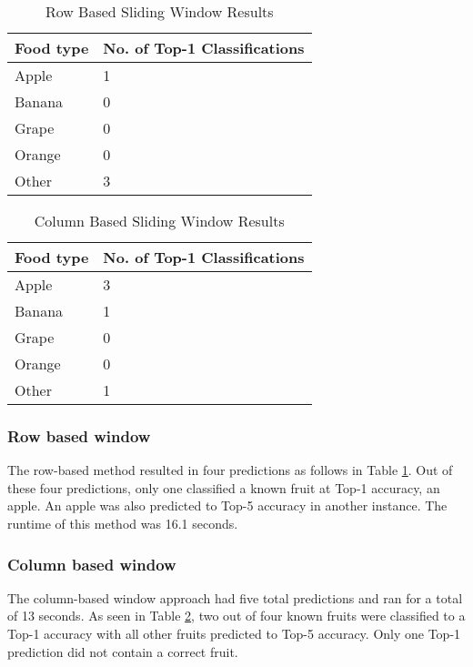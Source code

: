 \begin{table}[]
	\centering
	\caption{Row Based Sliding Window Results}
	\label{rowWindowTable}
	\begin{tabular}{|l|l|}
	\hline
		\textbf{Food type} & \textbf{No. of Top-1 Classifications} \\ \hline
		Apple     & 1                      \\ \hline
		Banana    & 0                      \\ \hline
		Grape     & 0                      \\ \hline
		Orange    & 0                      \\ \hline
		Other     & 3                     \\ \hline
	\end{tabular}
\end{table}

\begin{table}[]
	\centering
	\caption{Column Based Sliding Window Results}
	\label{colWindowTable}
	\begin{tabular}{|l|l|}
	\hline
		\textbf{Food type} & \textbf{No. of Top-1 Classifications} \\ \hline
		Apple     & 3                      \\ \hline
		Banana    & 1                      \\ \hline
		Grape     & 0                      \\ \hline
		Orange    & 0                      \\ \hline
		Other     & 1                     \\ \hline
	\end{tabular}
\end{table}

\tocless\subsubsection{Row based window}
The row-based method resulted in four predictions as follows in Table
\ref{rowWindowTable}. Out of these four predictions, only one classified a known
fruit at Top-1 accuracy, an apple. An apple was also predicted to Top-5 accuracy
in another instance. The runtime of this method was 16.1 seconds.

\tocless\subsubsection{Column based window}
The column-based window approach had five total predictions and ran for a total
of 13 seconds. As seen in Table \ref{colWindowTable}, two out of four known fruits
were classified to a Top-1 accuracy with all other fruits predicted to Top-5
accuracy. Only one Top-1 prediction did not contain a correct fruit.

